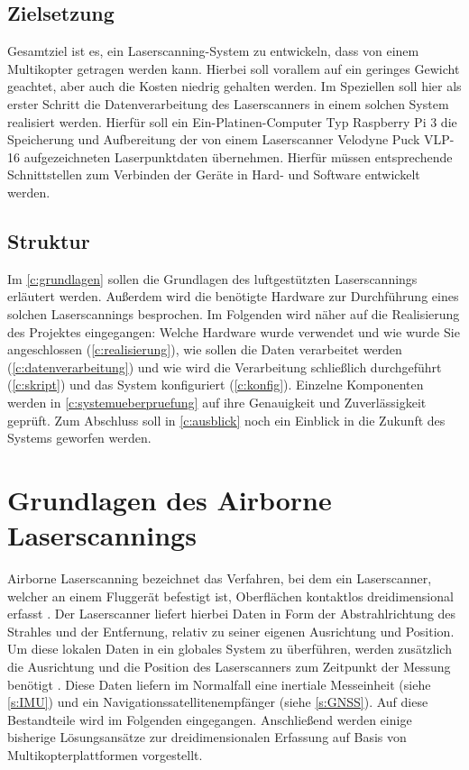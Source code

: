\documentclass[a4paper,12pt,bibliography=totoc, listof=totoc,titlepage,pointlessnumbers]{scrreprt}
\begin{document}
\section{Zielsetzung}
Gesamtziel ist es, ein Laserscanning-System zu entwickeln, dass von einem Multikopter getragen werden kann. Hierbei soll vorallem auf ein geringes Gewicht geachtet, aber auch die Kosten niedrig gehalten werden. Im Speziellen soll hier als erster Schritt die Datenverarbeitung des Laser\-scan\-ners in einem solchen System realisiert werden. Hierfür soll ein Ein-Platinen-Computer Typ Raspberry Pi 3 die Speicherung und Aufbereitung der von einem Laser\-scan\-ner Velodyne Puck VLP-16 aufgezeichneten Laserpunktdaten übernehmen. Hierfür müssen entsprechende Schnittstellen zum Verbinden der Geräte in Hard- und Software entwickelt werden.

\section{Struktur}
Im \autoref{c:grundlagen} sollen die Grundlagen des luftgestützten Laserscannings erläutert werden. Außerdem wird die benötigte Hardware zur Durchführung eines solchen Laserscannings besprochen. Im Folgenden wird näher auf die Realisierung des Projektes eingegangen: Welche Hardware wurde verwendet und wie wurde Sie angeschlossen (\autoref{c:realisierung}), wie sollen die Daten verarbeitet werden (\autoref{c:datenverarbeitung}) und wie wird die Verarbeitung schließlich durchgeführt (\autoref{c:skript}) und das System konfiguriert (\autoref{c:konfig}). Einzelne Komponenten werden in \autoref{c:systemueberpruefung} auf ihre Genauigkeit und Zuverlässigkeit geprüft. Zum Abschluss soll in \autoref{c:ausblick} noch ein Einblick in die Zukunft des Systems geworfen werden.

\chapter{Grundlagen des Airborne Laserscannings}
\label{c:grundlagen}

Airborne Laserscanning bezeichnet das Verfahren, bei dem ein Laser\-scan\-ner, welcher an einem Fluggerät befestigt ist, Oberflächen kontaktlos dreidimensional erfasst \citep[S. 1]{beraldin}. Der Laser\-scan\-ner liefert hierbei Daten in Form der Abstrahlrichtung des Strahles und der Entfernung, relativ zu seiner eigenen Ausrichtung und Position. Um diese lokalen Daten in ein globales System zu überführen, werden zusätzlich die Ausrichtung und die Position des Laser\-scan\-ners zum Zeitpunkt der Messung benötigt \citep[S. 22f]{beraldin}. Diese Daten liefern im Normalfall eine inertiale Messeinheit (siehe \autoref{s:IMU}) und ein Navigationssatellitenempfänger (siehe \autoref{s:GNSS}). Auf diese Bestandteile wird im Folgenden eingegangen. Anschließend werden einige bisherige Lösungsansätze zur dreidimensionalen Erfassung auf Basis von Multikopterplattformen vorgestellt.
\end{document}
